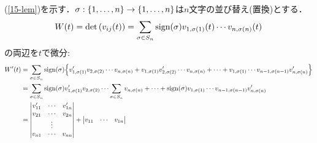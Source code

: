 \documentclass[autodetect-engine,dvipdfmx-if-dvi,ja=standard]{bxjsarticle}
\makeatletter
\theoremstyle{mystyle1}
\theoremstyle{mystyle2}
\renewenvironment{proof}[1][\proofname]{\par
  \pushQED{\qed}%
  \normalfont
  \topsep6\p@\@plus6\p@ \trivlist
  \item[\hskip\labelsep{\bfseries\sffamily #1}]\ignorespaces
}{%
  \popQED\endtrivlist\@endpefalse
}
\renewcommand\proofname{\ensuremath{\because}}
\makeatother
\begin{document}
\begin{proof}
  (\ref{15-lem})を示す．$\sigma:\qty{1,\ldots,n}\to\qty{1,\ldots,n}$は$n$文字の並び替え(置換)とする．
  \[W\qty(t)=\det\qty(v_{ij}\qty(t))=\sum_{\sigma\in S_n}\text{sign}\qty(\sigma)v_{1,\sigma\qty(1)}\qty(t)\cdots v_{n,\sigma\qty(n)}\qty(t)\]
  の両辺を$t$で微分:
  \begin{align*}
    W^\prime\qty(t)
                  & =\sum_{\sigma\in S_n}\text{sign}\qty(\sigma)\qty{v_{1,\sigma\qty(1)}^\prime v_{2,\sigma\qty(2)}\cdots v_{n,\sigma\qty(n)}+v_{1,\sigma\qty(1)} v_{2,\sigma\qty(2)}^\prime\cdots v_{n,\sigma\qty(n)}+\cdots+v_{1,\sigma\qty(1)}\cdots v_{n-1,\sigma\qty(n-1)}v_{n,\sigma\qty(n)}^\prime}                 \\
                  & =\sum_{\sigma\in S_n}\text{sign}\qty(\sigma)v_{1,\sigma\qty(1)}^\prime v_{2,\sigma\qty(2)}\cdots\sum_{\sigma\in S_n}v_{n,\sigma\qty(n)}+\cdots+\text{sign}\qty(\sigma)v_{1,\sigma\qty(1)}\cdots v_{n-1,\sigma\qty(n-1)}v_{n,\sigma\qty(n)}^\prime                                                      \\
                  & =\mdet{
    v_{11}^\prime & \cdots                                                                                                                                                                                                                                                                                 & v_{1n}^\prime \\
    v_{21}        & \cdots                                                                                                                                                                                                                                                                                 & v_{2n}        \\
                  & \vdots                                                                                                                                                                                                                                                                                 &               \\
    v_{n1}        & \cdots                                                                                                                                                                                                                                                                                 & v_{nn}
    }+\mdet{
    v_{11}        & \cdots                                                                                                                                                                                                                                                                                 & v_{1n}        \\
}
\end{align*}
\end{proof}
\end{document}
